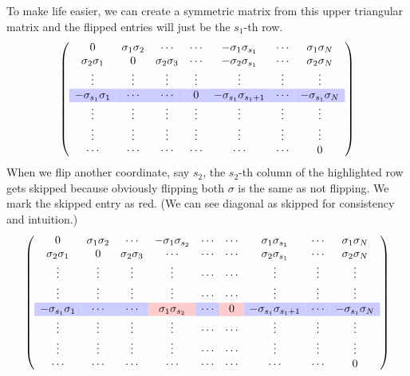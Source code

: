 \documentclass[10pt]{article}
\newcommand\y{\cellcolor{blue!20}}
\newcommand\x{\cellcolor{red!20}}
\newenvironment{Proof of lemma}{\noindent{\bf Proof of Lemma}}{\hfill$\Box$\newline}
\newenvironment{Proof of claim}{\noindent{\bf Proof of claim}}{\hfill$\Box$\newline}
\newenvironment{Proof of theorem}{\noindent{\bf Proof of Theorem}}{\hfill\scriptsize{$\Box$}\newline}
\newenvironment{Proof of theorems}{\noindent{\bf Proof of Theorems}}{\hfill$\Box$\newline}
\newenvironment{Proof of proposition}{\noindent{\bf Proof of Proposition}}{\hfill$\Box$\newline}
\newenvironment{Proof of propositions}{\noindent{\bf Proof of Propositions}}{\hfill$\Box$\newline}
\newenvironment{Proof of exercise}{\noindent{\it Proof of Exercise:}}{\hfill$\Box$}
\numberwithin{equation}{section}
\begin{document}
To make life easier, we can create a symmetric matrix from this upper triangular matrix and the flipped entries will just be the $s_1$-th row.
\begin{equation}
    \left(\begin{array}{ccccccc}
      0     &\sigma_1 \sigma_2  &\cdots            &\cdots & -\sigma_1 \sigma_{s_1}       & \cdots   & \sigma_1 \sigma_N \\
      \sigma_2 \sigma_1      &0                  &\sigma_2 \sigma_3 &\cdots & -\sigma_2 \sigma_{s_1} & \cdots & \sigma_2 \sigma_N \\
      \vdots&\vdots             &\vdots            &\vdots & \vdots               & \vdots & \vdots\\
      \y -\sigma_{s_1} \sigma_1 & \y \cdots        &\y \cdots &\y0 &\y -\sigma_{s_1} \sigma_{s_1+1}& \y \cdots & \y -\sigma_{s_1} \sigma_{N} \\
      \vdots&\vdots             &\vdots            &\vdots & \vdots & \vdots & \vdots\\
      \vdots&\vdots             &\vdots            &\vdots & \vdots & \vdots & \vdots\\
      \cdots&\cdots             &\cdots            &\cdots & \cdots & \cdots &  0\\
    \end{array}\right)
\end{equation}
When we flip another coordinate, say $s_2$, the $s_2$-th column of the highlighted row gets skipped because obviously flipping both $\sigma$ is the same as not flipping. We mark the skipped entry as red. (We can see diagonal as skipped for consistency and intuition.)
\begin{equation}
    \left(\begin{array}{ccccccccc}
      0     &\sigma_1 \sigma_2  &\cdots             & -\sigma_1 \sigma_{s_2} &\cdots &\cdots& \sigma_1 \sigma_{s_1}       & \cdots   & \sigma_1 \sigma_N \\
      \sigma_2 \sigma_1     &0                  &\sigma_2 \sigma_3 &\cdots & \cdots &\cdots& \sigma_2 \sigma_{s_1} & \cdots & \sigma_2 \sigma_N \\
      \vdots&\vdots             &\vdots            &\vdots &\cdots &\cdots &\vdots               & \vdots & \vdots\\
      \vdots&\vdots             &\vdots            &\vdots &\cdots&\cdots& \vdots & \vdots & \vdots\\
      \y -\sigma_{s_1} \sigma_1 & \y \cdots        &\y \cdots &\x \sigma_1 \sigma_{s_2} &\y \cdots&\x 0 &\y -\sigma_{s_1} \sigma_{s_1+1}& \y \cdots & \y -\sigma_{s_1} \sigma_{N} \\
      \vdots&\vdots             &\vdots            &\vdots &\cdots&\cdots& \vdots & \vdots & \vdots\\
      \vdots&\vdots             &\vdots            &\vdots &\cdots&\cdots& \vdots & \vdots & \vdots\\
      \cdots&\cdots             &\cdots            &\cdots &\cdots&\cdots& \cdots & \cdots &  0\\
    \end{array}\right)
\end{equation}
\end{document}
